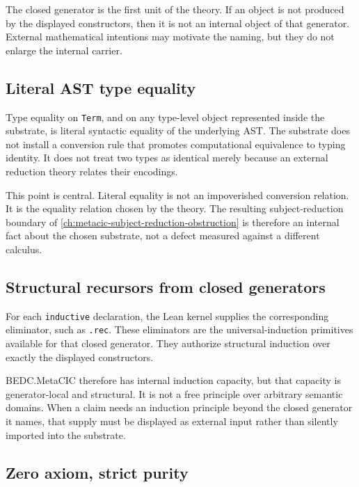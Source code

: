 The closed generator is the first unit of the theory. If an object is
not produced by the displayed constructors, then it is not an internal
object of that generator. External mathematical intentions may motivate
the naming, but they do not enlarge the internal carrier.

\subsection{Literal AST type equality}
\label{subsec:bedc-is-its-own-theory-literal-ast-equality}

Type equality on \texttt{Term}, and on any type-level object represented
inside the substrate, is literal syntactic equality of the underlying
AST. The substrate does not install a conversion rule that promotes
computational equivalence to typing identity. It does not treat two
types as identical merely because an external reduction theory relates
their encodings.

This point is central. Literal equality is not an impoverished
conversion relation. It is the equality relation chosen by the theory.
The resulting subject-reduction boundary of
\autoref{ch:metacic-subject-reduction-obstruction} is therefore an
internal fact about the chosen substrate, not a defect measured against a
different calculus.

\subsection{Structural recursors from closed generators}
\label{subsec:bedc-is-its-own-theory-structural-recursors}

For each \texttt{inductive} declaration, the Lean kernel supplies the
corresponding eliminator, such as \texttt{.rec}. These eliminators are
the universal-induction primitives available for that closed generator.
They authorize structural induction over exactly the displayed
constructors.

BEDC.MetaCIC therefore has internal induction capacity, but that
capacity is generator-local and structural. It is not a free principle
over arbitrary semantic domains. When a claim needs an induction
principle beyond the closed generator it names, that supply must be
displayed as external input rather than silently imported into the
substrate.

\subsection{Zero axiom, strict purity}
\label{subsec:bedc-is-its-own-theory-zero-axiom}

